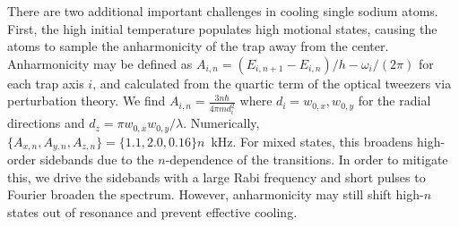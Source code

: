 \documentclass[aps,prl,twocolumn,groupedaddress]{revtex4-1}
\begin{document}
There are two additional important challenges in cooling single sodium atoms.
First, the high initial temperature populates high motional states,
causing the atoms to sample the anharmonicity of the trap away from the center. Anharmonicity may be defined as $A_{i,n}=(E_{i,n+1}-E_{i,n})/h - \omega_i/(2\pi)$ for each trap axis $i$, and calculated from the quartic term of the optical tweezers via perturbation theory.  We find $A_{i,n}=\frac{3n \hbar}{4 \pi m d_i^2}$  where $d_i=w_{0,x},w_{0,y}$ for the radial directions and $d_z=\pi w_{0,x}w_{0,y}/\lambda$.  Numerically, $\{A_{x,n},A_{y,n},A_{z,n}\}=\{1.1, 2.0, 0.16\}n$~kHz. For mixed states, this  broadens high-order sidebands due to the $n$-dependence of the transitions.
In order to mitigate this, we drive the sidebands with a large  Rabi frequency
and short pulses to Fourier broaden the spectrum. %
However, anharmonicity  may still shift high-$n$ states out of resonance and prevent effective cooling.

\end{document}
